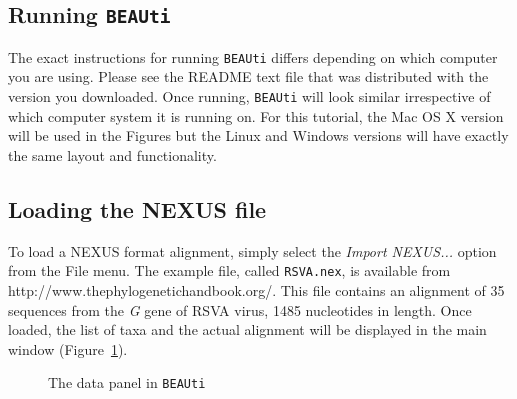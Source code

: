 \documentclass[cup7b, english]{cupbook}
\begin{document}
\subsection{Running \texttt{BEAUti}}

The exact instructions for running \texttt{BEAUti} differs depending on which computer you are using. Please see the README
text file that was distributed with the version you downloaded. Once running, \texttt{BEAUti} will look similar irrespective
of which computer system it is running on. For this tutorial, the Mac OS X version will be used in the Figures but
the Linux and Windows versions will have exactly the same layout and functionality.

\subsection{Loading the NEXUS file}

To load a NEXUS format alignment, simply select the {\it Import NEXUS...} option from the File menu. The example
file, called \texttt{RSVA.nex}, is available from http://www.thephylogenetichandbook.org/. This file contains an 
alignment of 35 sequences from the {\it G} gene of RSVA virus, 1485 nucleotides in length.
Once loaded, the list of taxa and the actual alignment will be displayed in the
main window (Figure~\ref{fig:figure1}).

\begin{figure}[htbp]
\begin{center}
\leavevmode
{}
\end{center}
\caption{The data panel in \texttt{BEAUti}}
\label{fig:figure1}
\end{figure}
\end{document}
